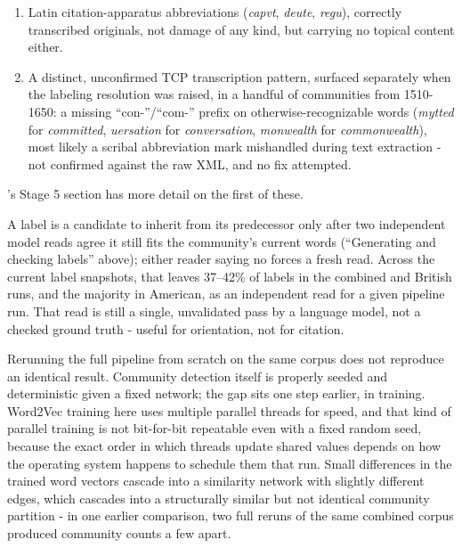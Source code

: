 \documentclass[11pt]{article}
\begin{document}
\begin{enumerate}[itemsep=0.15em,label=\arabic*.]
  \item Latin citation-apparatus abbreviations (\emph{capvt},
    \emph{deute}, \emph{regu}), correctly transcribed originals, not
    damage of any kind, but carrying no topical content either.
  \item A distinct, unconfirmed TCP transcription pattern, surfaced
    separately when the labeling resolution was raised, in a handful of
    communities from 1510-1650: a missing ``con-''/``com-'' prefix on
    otherwise-recognizable words (\emph{mytted} for \emph{committed},
    \emph{uersation} for \emph{conversation}, \emph{monwealth} for
    \emph{commonwealth}), most likely a scribal abbreviation mark
    mishandled during text extraction - not confirmed against the raw
    XML, and no fix attempted.
\end{enumerate}

's Stage 5 section has more detail on
the first of these.

 A label is a candidate to inherit from
its predecessor only after two independent model reads agree it still
fits the community's current words (``Generating and checking labels''
above); either
reader saying no forces a fresh read. Across the current label
snapshots, that leaves 37--42\% of labels in the combined and British
runs, and the majority in American, as an independent read for a given
pipeline run. That read is still a single, unvalidated pass by a
language model, not a checked ground truth - useful for orientation, not
for citation.

 Rerunning the full pipeline from scratch on
the same corpus does not reproduce an identical result. Community
detection itself is properly seeded and deterministic given a fixed
network; the gap sits one step earlier, in training. Word2Vec training
here uses multiple parallel threads for speed, and that kind of parallel
training is not bit-for-bit repeatable even with a fixed random seed,
because the exact order in which threads update shared values depends on
how the operating system happens to schedule them that run. Small
differences in the trained word vectors cascade into a similarity
network with slightly different edges, which cascades into a
structurally similar but not identical community partition - in one
earlier comparison, two full reruns of the same combined corpus produced
community counts a few apart.
\end{document}
